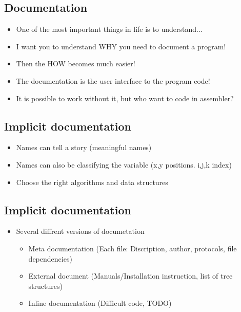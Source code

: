\begin{multicols}{2}
\section{Documentation}
\begin{itemize}
\item One of the most important things in life is to understand...
\item I want you to understand WHY you need to document a program!
\item Then the HOW becomes much easier!
\end{itemize}

\begin{itemize}
\item The documentation is the user interface to the program code!
\item It is possible to work without it, but who want to code in assembler?
\end{itemize}

\subsection{Implicit documentation}
\begin{itemize}
\item Names can tell a story (meaningful names)
\item Names can also be classifying the variable (x,y positions. i,j,k index)
\item Choose the right algorithms and data structures
\end{itemize}


\subsection{Implicit documentation}
\begin{itemize}
\item Several diffrent versions of documetation
  \begin{itemize}
  \item Meta documentation (Each file: Discription, author, protocols, file dependencies)
  \item External document (Manuals/Installation instruction, list of tree structures)
  \item Inline documentation (Difficult code, TODO)
  \end{itemize}
\end{itemize}



\end{multicols}
